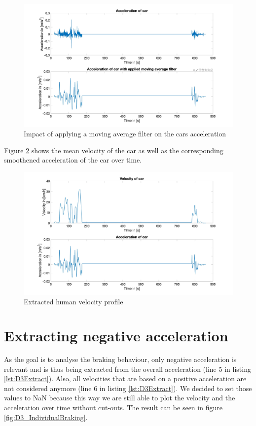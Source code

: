 \begin{figure}[H]
\centering
\includegraphics[width=1\textwidth]{images/D3_moving_average.jpg}
\caption{Impact of applying a moving average filter on the cars acceleration}
\label{fig:D3_MovingAverage}
\end{figure}

Figure \ref{fig:D3_Fig_Overview} shows the mean velocity of the car as well as the corresponding smoothened acceleration of the car over time.

\begin{figure}[H]
\centering
\includegraphics[width=1\textwidth]{images/D3_Fig_Overview.jpg}
\caption{Extracted human velocity profile}
\label{fig:D3_Fig_Overview}
\end{figure}


\section{Extracting negative acceleration}
As the goal is to analyse the braking behaviour, only negative acceleration is relevant and is thus being extracted from the overall acceleration (line 5 in listing \ref{lst:D3Extract}). Also, all velocities that are based on a positive acceleration are not considered anymore (line 6 in listing \ref{lst:D3Extract}). We decided to set those values to \ac{NaN} because this way we are still able to plot the velocity and the acceleration over time without cut-outs. The result can be seen in figure \ref{fig:D3_IndividualBraking}. 

